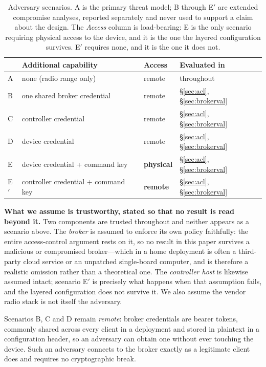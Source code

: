 \begin{table}[htbp]
\centering\small
\caption{Adversary scenarios. A is the primary threat model; B through E$'$ are extended
compromise analyses, reported separately and never used to support a claim about the design.
The \emph{Access} column is load-bearing: E is the only scenario requiring physical access to
the device, and it is the one the layered configuration survives. E$'$ requires none, and it is
the one it does not.}
\label{tab:threats}
\begin{tabular}{@{}llll@{}}
\toprule
& Additional capability & Access & Evaluated in \\
\midrule
A & none (radio range only)      & remote   & throughout \\
B & one shared broker credential & remote   & \S\ref{sec:acl}, \S\ref{sec:brokerval} \\
C & controller credential        & remote   & \S\ref{sec:acl}, \S\ref{sec:brokerval} \\
D & device credential            & remote   & \S\ref{sec:acl}, \S\ref{sec:brokerval} \\
E & device credential + command key & \textbf{physical} & \S\ref{sec:acl}, \S\ref{sec:brokerval} \\
E$'$ & controller credential + command key & \textbf{remote} & \S\ref{sec:acl}, \S\ref{sec:brokerval} \\
\bottomrule
\end{tabular}
\end{table}

\textbf{What we assume is trustworthy, stated so that no result is read beyond it.} Two components
are trusted throughout and neither appears as a scenario above. The \emph{broker} is assumed to
enforce its own policy faithfully: the entire access-control argument rests on it, so no result in
this paper survives a malicious or compromised broker---which in a home deployment is often a
third-party cloud service or an unpatched single-board computer, and is therefore a realistic
omission rather than a theoretical one. The \emph{controller host} is likewise assumed intact;
scenario E$'$ is precisely what happens when that assumption fails, and the layered configuration
does not survive it. We also assume the vendor radio stack is not itself the adversary.

Scenarios B, C and D remain \emph{remote}: broker credentials are bearer tokens, commonly
shared across every client in a deployment and stored in plaintext in a configuration header,
so an adversary can obtain one without ever touching the device. Such an adversary connects to
the broker exactly as a legitimate client does and requires no cryptographic break.

